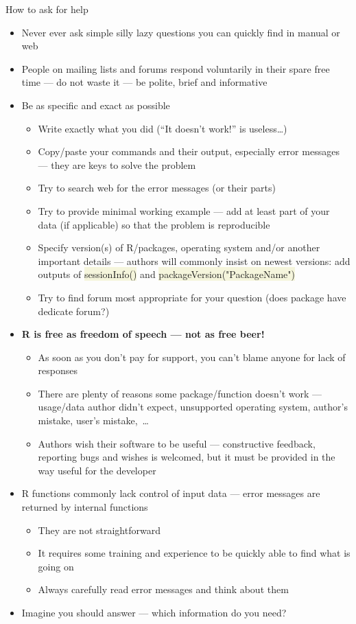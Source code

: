 \documentclass[compress, xelatex, 11pt, xcolor=svgnames, aspectratio=169, url={hyphens, lowtilde}]{beamer}
\renewcommand{\texttt}[1]{\colorbox{Beige}{{\ttfamily #1}}}
\begin{document}
\begin{frame}[allowframebreaks]{How to ask for help}
	\label{howtoask}
	\begin{itemize}
		\item \alert{Never ever} ask simple silly lazy questions you can quickly find in manual or web
		\item People on mailing lists and forums respond voluntarily in their spare free time --- do not waste it --- be polite, brief and informative
		\item Be as specific and exact as possible
		\begin{itemize}
			\item Write \alert{exactly} what you did (\enquote{It doesn't work!} is useless\ldots)
			\item Copy/paste your commands and their output, especially error messages --- they are keys to solve the problem
			\item Try to search web for the error messages (or their parts)
			\item Try to provide minimal working example --- add at least part of your data (if applicable) so that the problem is reproducible
			\item Specify version(s) of R/packages, operating system and/or another important details --- authors will commonly insist on newest versions: add outputs of \texttt{sessionInfo()} and \texttt{packageVersion("PackageName")}
			\item Try to find forum most appropriate for your question (does package have dedicate forum?)
		\end{itemize}
		\item \textbf{R is free as freedom of speech --- not as free beer!}
		\begin{itemize}
			\item As soon as you don't pay for support, you can't blame anyone for lack of responses
			\item There are plenty of reasons some package/function doesn't work --- usage/data author didn't expect, unsupported operating system, author's mistake, user's mistake,~\ldots
			\item Authors wish their software to be useful --- constructive feedback, reporting bugs and wishes is welcomed, but it must be provided in the way useful for the developer
		\end{itemize}
		\item R functions commonly lack control of input data --- error messages are returned by internal functions
		\begin{itemize}
			\item They are not straightforward
			\item It requires some training and experience to be quickly able to find what is going on
			\item Always carefully read error messages and think about them
		\end{itemize}
		\item Imagine you should answer --- which information do you need?
	\end{itemize}
\end{frame}
\end{document}
